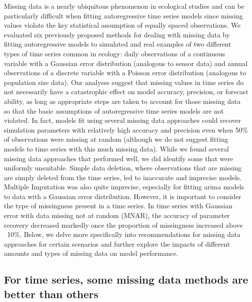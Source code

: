 \documentclass{article}
\begin{document}
Missing data is a nearly ubiquitous phenomenon in ecological studies and can be particularly difficult when fitting autoregressive time series models since missing values violate the key statistical assumption of equally spaced observations. We evaluated six previously proposed methods for dealing with missing data by fitting autoregressive models to simulated and real examples of two different types of time series common in ecology: daily observations of a continuous variable with a Gaussian error distribution (analogous to sensor data) and annual observations of a discrete variable with a Poisson error distribution (analogous to population size data). Our analyses suggest that missing values in time series do not necessarily have a catastrophic effect on model accuracy, precision, or forecast ability, as long as appropriate steps are taken to account for those missing data so that the basic assumptions of autoregressive time series models are not violated. In fact, models fit using several missing data approaches could recover simulation parameters with relatively high accuracy and precision even when 50\% of observations were missing at random (although we do not suggest fitting models to time series with this much missing data). While we found several missing data approaches that performed well, we did identify some that were uniformly unsuitable. Simple data deletion, where observations that are missing are simply deleted from the time series, led to inaccurate and imprecise models. Multiple Imputation was also quite imprecise, especially for fitting arima models to data with a Gaussian error distribution. However, it is important to consider the type of missingness present in a time series. In time series with Gaussian error with data missing not at random (MNAR), the accuracy of parameter recovery decreased markedly once the proportion of missingness increased above ~10\%.  Below, we delve more specifically into recommendations for missing data approaches for certain scenarios and further explore the impacts of different amounts and types of missing data on model performance. 

\subsection*{For time series, some missing data methods are better than others}
\end{document}
